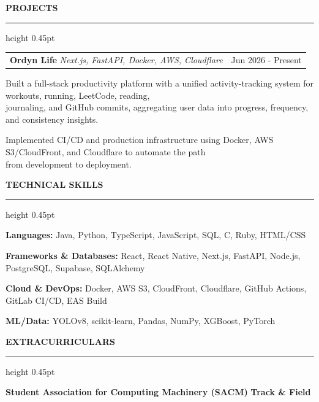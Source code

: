 \documentclass[letterpaper,10pt]{article}
\makeatletter
\newcommand{\sectionfont}{\fontsize{9.96}{10.9}\selectfont\bfseries}
\newcommand{\entryfont}{\fontsize{9.48}{10.92}\selectfont}
\newcommand{\projectbulletfont}{\fontsize{9.48}{10.92}\selectfont}
\newcommand{\resumesection}[1]{%
  \vspace{2.15pt}%
  {\sectionfont #1}\par
  \vspace{0.15pt}\hrule height 0.45pt\vspace{4.45pt}%
}
\newcommand{\twocolrow}[2]{%
  \noindent\begin{tabular*}{\textwidth}{@{}l@{\extracolsep{\fill}}r@{}}
    #1 & #2
  \end{tabular*}\par
}
\newcommand{\projectbullet}[1]{%
  {\projectbulletfont\noindent\hangindent=17.52pt\hangafter=1\makebox[6pt][l]{\textbullet\hspace{2pt}}#1\par\vspace{0.95pt}}%
}
\makeatother
\begin{document}
\resumesection{PROJECTS}
{\entryfont
\twocolrow{\textbf{Ordyn Life} \textit{\textbar{} Next.js, FastAPI, Docker, AWS, Cloudflare}}{Jun 2026 - Present}
}
\projectbullet{Built a full-stack productivity platform with a unified activity-tracking system for workouts, running, LeetCode, reading,\\
journaling, and GitHub commits, aggregating user data into progress, frequency, and consistency insights.}
\projectbullet{Implemented CI/CD and production infrastructure using Docker, AWS S3/CloudFront, and Cloudflare to automate the path\\
from development to deployment.}

\resumesection{TECHNICAL SKILLS}
{\entryfont
\textbf{Languages:} Java, Python, TypeScript, JavaScript, SQL, C, Ruby, HTML/CSS\par
\textbf{Frameworks \& Databases:} React, React Native, Next.js, FastAPI, Node.js, PostgreSQL, Supabase, SQLAlchemy\par
\textbf{Cloud \& DevOps:} Docker, AWS S3, CloudFront, Cloudflare, GitHub Actions, GitLab CI/CD, EAS Build\par
\textbf{ML/Data:} YOLOv8, scikit-learn, Pandas, NumPy, XGBoost, PyTorch\par
}

\resumesection{EXTRACURRICULARS}
{\entryfont\textbf{Student Association for Computing Machinery (SACM)} \quad\textbar\quad \textbf{Track \& Field}\par}
\end{document}
